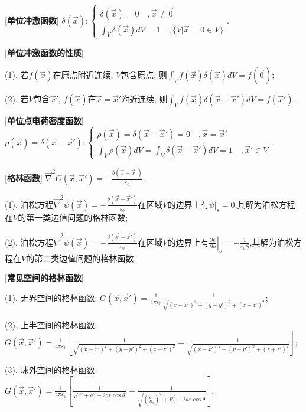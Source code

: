 [\textbf{单位冲激函数}] $\delta(\vec x):\begin{cases}\delta(\vec x)=0\quad,\vec x\ne \vec 0\\ \int_V\delta(\vec x)dV=1\quad ,\{V|\vec x=0\in V\}\end{cases}$.\par

[\textbf{单位冲激函数的性质}] \par
\qquad (1). 若$f(\vec x)$在原点附近连续, $V$包含原点, 则$\int_Vf(\vec x)\delta(\vec x)dV=f(\vec 0)$;\par
\qquad (2). 若$V$包含$\vec x'$, $f(\vec x)$在$\vec x=\vec x'$附近连续, 则$\int_Vf(\vec x)\delta(\vec x-\vec x')dV=f(\vec x')$.\par

[\textbf{单位点电荷密度函数}] $\rho(\vec x)=\delta(\vec x-\vec x'):\begin{cases}\rho(\vec x)=\delta(\vec x-\vec x')=0\quad ,\vec x=\vec x'\\ \int_V\rho(\vec x)dV=\int_V\delta(\vec x-\vec x')dV=1\quad ,\vec x'\in V\end{cases}$.\par

[\textbf{格林函数}] $\vec\nabla^2G(\vec x,\vec x')=-\frac{\delta(\vec x-\vec x')}{\varepsilon_0}$.\par
\qquad (1). 泊松方程$\vec\nabla^2\psi(\vec x)=-\frac{\delta(\vec x-\vec x')}{\varepsilon_0}$在区域$V$的边界上有$\left.\psi\right|_s=0$,其解为泊松方程在$V$的第一类边值问题的格林函数;\par
\qquad (2). 泊松方程$\vec\nabla^2\psi(\vec x)=-\frac{\delta(\vec x-\vec x')}{\varepsilon_0}$在区域$V$的边界上有$\left.\frac{\partial \psi}{\partial n}\right|_s=-\frac{1}{\varepsilon_0S}$,其解为泊松方程在$V$的第二类边值问题的格林函数.\par

\clearpage

[\textbf{常见空间的格林函数}]\par
\qquad (1). 无界空间的格林函数: $G(\vec x,\vec x')=\frac{1}{4\pi\varepsilon_0}\frac{1}{\sqrt{(x-x')^2+(y-y')^2+(z-z')^2}}$;\par
\qquad (2). 上半空间的格林函数: $G(\vec x,\vec x')=\frac{1}{4\pi\varepsilon_0}\left[\frac{1}{\sqrt{(x-x')^2+(y-y')^2+(z-z')^2}}-\frac{1}{\sqrt{(x-x')^2+(y-y')^2+(z+z')^2}}\right]$;\par
\qquad (3). 球外空间的格林函数: $G(\vec x,\vec x')=\frac{1}{4\pi\varepsilon_0}\left[\frac{1}{\sqrt{r^2+a^2-2ar\cos\theta}}-\frac{1}{\sqrt{\left(\frac{ar}{R_0}\right)^2+R_0^2-2ar\cos\theta}}\right]$.\par

